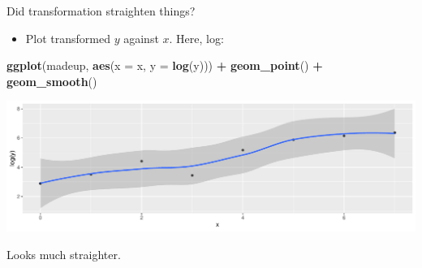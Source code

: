 \documentclass[
  ignorenonframetext,
]{beamer}
\newenvironment{Shaded}{\begin{snugshade}}{\end{snugshade}}
\newcommand{\DataTypeTok}[1]{\textcolor[rgb]{0.13,0.29,0.53}{#1}}
\newcommand{\KeywordTok}[1]{\textcolor[rgb]{0.13,0.29,0.53}{\textbf{#1}}}
\newcommand{\NormalTok}[1]{#1}
\newcommand{\OperatorTok}[1]{\textcolor[rgb]{0.81,0.36,0.00}{\textbf{#1}}}
\newcommand{\StringTok}[1]{\textcolor[rgb]{0.31,0.60,0.02}{#1}}
\providecommand{\tightlist}{%
  \setlength{\itemsep}{0pt}\setlength{\parskip}{0pt}}
\begin{document}
\begin{frame}[fragile]{Did transformation straighten things?}
\protect\hypertarget{did-transformation-straighten-things}{}

\begin{itemize}
\tightlist
\item
  Plot transformed \(y\) against \(x\). Here, log:
\end{itemize}

\begin{Shaded}
\begin{Highlighting}[]
\KeywordTok{ggplot}\NormalTok{(madeup, }\KeywordTok{aes}\NormalTok{(}\DataTypeTok{x =}\NormalTok{ x, }\DataTypeTok{y =} \KeywordTok{log}\NormalTok{(y))) }\OperatorTok{+}\StringTok{ }\KeywordTok{geom_point}\NormalTok{() }\OperatorTok{+}
\StringTok{  }\KeywordTok{geom_smooth}\NormalTok{()}
\end{Highlighting}
\end{Shaded}

\includegraphics{slides_d29_files/figure-beamer/unnamed-chunk-50-1.pdf}

Looks much straighter.

\end{frame}
\end{document}
